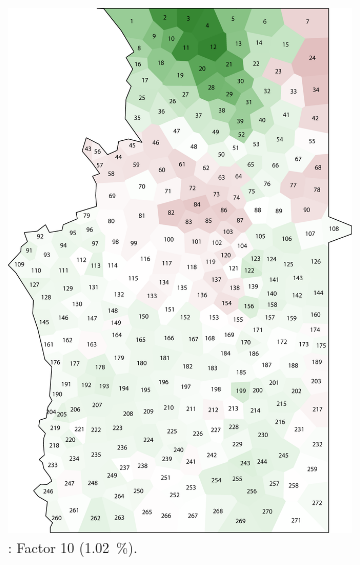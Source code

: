 \documentclass[output=paper]{LSP/langsci}
\begin{document}
\begin{figure}
\begin{subfigure}[t]{0.3\textwidth}
\includegraphics[width=\textwidth]{illustrations/pickl_fig9}
\caption{: Factor 10 (1.02~\%).}
\label{fig:9}
\end{subfigure}   
~
\begin{subfigure}[t]{0.3\textwidth}

\end{subfigure}
\end{figure}
\end{document}
